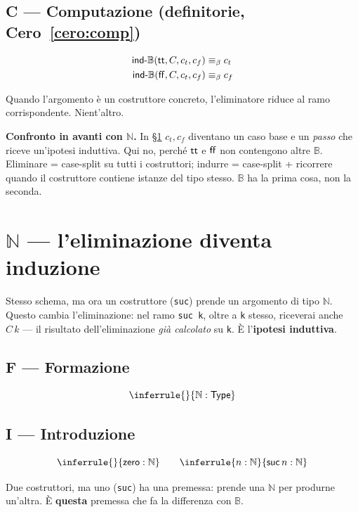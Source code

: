 \section*{C --- Computazione (definitorie, Cero~\ref{cero:comp})}
\begin{align*}
\mathsf{ind\text{-}\mathbb{B}}(\mathsf{tt}, C, c_t, c_f) &\equiv_{\beta} c_t \\
\mathsf{ind\text{-}\mathbb{B}}(\mathsf{ff},  C, c_t, c_f) &\equiv_{\beta} c_f
\end{align*}

Quando l'argomento \`e un costruttore concreto, l'eliminatore riduce al ramo corrispondente. Nient'altro.

\medskip

\noindent\textbf{Confronto in avanti con $\mathbb{N}$.} In \S\ref{cap:nat} $c_t, c_f$ diventano un caso base e un \emph{passo} che riceve un'ipotesi induttiva. Qui no, perch\'e $\mathsf{tt}$ e $\mathsf{ff}$ non contengono altre $\mathbb{B}$. Eliminare = case-split su tutti i costruttori; indurre = case-split + ricorrere quando il costruttore contiene istanze del tipo stesso. $\mathbb{B}$ ha la prima cosa, non la seconda.

\chapter{$\mathbb{N}$ --- l'eliminazione diventa induzione}\label{cap:nat}

Stesso schema, ma ora un costruttore (\texttt{suc}) prende un argomento di tipo $\mathbb{N}$. Questo cambia l'eliminazione: nel ramo \texttt{suc k}, oltre a \texttt{k} stesso, riceverai anche $C\,k$ --- il risultato dell'eliminazione \emph{gi\`a calcolato} su \texttt{k}. \`E l'\textbf{ipotesi induttiva}.

\section*{F --- Formazione}
\[
\inferrule{ }{\mathbb{N} : \Type}
\]

\section*{I --- Introduzione}
\[
\inferrule{ }{\zero : \mathbb{N}}
\qquad
\inferrule{n : \mathbb{N}}{\suc\,n : \mathbb{N}}
\]

Due costruttori, ma uno (\texttt{suc}) ha una premessa: prende una $\mathbb{N}$ per produrne un'altra. \`E \textbf{questa} premessa che fa la differenza con $\mathbb{B}$.


